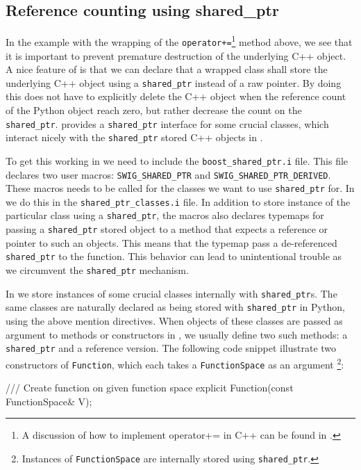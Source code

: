 \begin{code}
\subsection{Reference counting using shared\_ptr}
In the example with the wrapping of the \texttt{operator+=}\footnote{A discussion of how to implement operator+= in C++ can be found in \cite{Mey97}.}   method above, we see that it is important to prevent premature destruction of the underlying C++ object. A nice feature of \swig is that we can declare that a wrapped class shall store the underlying C++ object using a \texttt{shared\_ptr} instead of a raw pointer. By doing this \swig does not have to explicitly delete the C++ object when the reference count of the Python object reach zero, but rather decrease the count on the \texttt{shared\_ptr}. \dolfin provides a \texttt{shared\_ptr} interface for some crucial classes, which interact nicely with the \texttt{shared\_ptr} stored C++ objects in \dolfin. \par

To get this working in \pydolfin we need to include the \texttt{boost\_shared\_ptr.i} file. This file declares two user macros: \texttt{SWIG\_}\-\texttt{SHARED\_}\-\texttt{PTR} and \texttt{SWIG\_}\-\texttt{SHARED\_PTR\_}\-\texttt{DERIVED}. These macros needs to be called for the classes we want to use \texttt{shared\_ptr} for. In \pydolfin we do this in the \texttt{shared\_ptr\_classes.i} file. In addition to store instance of the particular class using a \texttt{shared\_ptr}, the macros also declares typemaps for passing a \texttt{shared\_ptr} stored object to a method that expects a reference or pointer to such an objects. This means that the typemap pass a de-referenced \texttt{shared\_ptr} to the function. This behavior can lead to unintentional trouble as we circumvent the \texttt{shared\_ptr} mechanism.\par

In \dolfin we store instances of some crucial classes internally with \texttt{shared\_ptr}s. The same classes are naturally declared as being stored with \texttt{shared\_ptr} in Python, using the above mention directives. When objects of these classes are passed as argument to methods or constructors in \dolfin, we usually define two such methods: a \texttt{shared\_ptr} and a reference version. The following code snippet illustrate two constructors of \texttt{Function}, which each takes a \texttt{FunctionSpace} as an argument \footnote{Instances of \texttt{FunctionSpace} are internally stored using \texttt{shared\_ptr}.}:
\begin{code}
/// Create function on given function space
explicit Function(const FunctionSpace& V);


\end{code}
\end{code}

